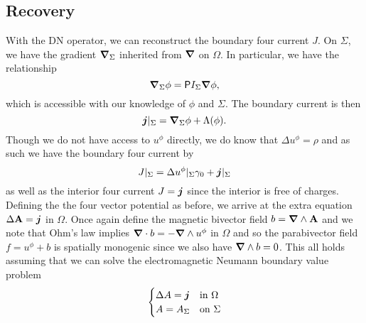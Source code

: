 
\subsection{Recovery}

With the DN operator, we can reconstruct the boundary four current $J$.  On $\Sigma$, we have the gradient $\boldsymbol{\nabla}_\Sigma$ inherited from $\boldsymbol{\nabla}$ on $\Omega$.  In particular, we have the relationship
\[
\boldsymbol{\nabla}_\Sigma \phi = \mathsf{P}{I_\Sigma}{\boldsymbol{\nabla} \phi},
\]
which is accessible with our knowledge of $\phi$ and $\Sigma$. The boundary current is then
\[
\boldsymbol{j}\vert_{\Sigma} = \boldsymbol{\nabla}_\Sigma \phi + \Lambda(\phi).
\]
Though we do not have access to $u^\phi$ directly, we do know that $\Delta u^\phi = \rho$ and as such we have the boundary four current by
\[
J\vert_\Sigma = \Delta u^\phi\vert_\Sigma \gamma_0 + \boldsymbol{j}\vert_\Sigma
\]
as well as the interior four current $J = \boldsymbol{j}$ since the interior is free of charges.  Defining the the four vector potential as before, we arrive at the extra equation $\Delta \mathbf{A} = \boldsymbol{j}$ in $\Omega$. Once again define the magnetic bivector field $b=\boldsymbol{\nabla} \wedge \mathbf{A}$ and we note that Ohm's law implies $\boldsymbol{\nabla} \cdot b = -\boldsymbol{\nabla} \wedge u^\phi$ in $\Omega$ and so the parabivector field $f=u^\phi + b$ is spatially monogenic since we also have $\boldsymbol{\nabla} \wedge b = 0$.  This all holds assuming that we can solve the electromagnetic Neumann boundary value problem
\[
\begin{cases} \Delta A = \boldsymbol{j} & \textrm{in $\Omega$}\\ A = A_\Sigma & \textrm{on $\Sigma$} \end{cases}
\]


